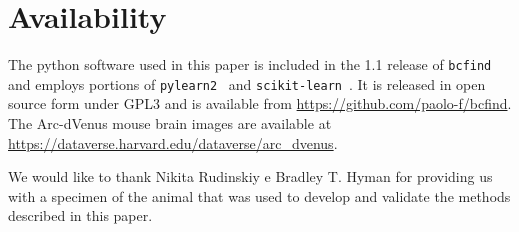 \documentclass[smallextended]{svjour3}       %
\begin{document}
\section*{Availability}
The python software used in this paper is included in the 1.1 release
of \texttt{bcfind}~\cite{frasconi_large-scale_2014} and employs
portions of \texttt{pylearn2}~\cite{goodfellow_pylearn2:_2013} and
\texttt{scikit-learn}~\cite{pedregosa_scikit-learn:_2011}. It is released in open source form
under GPL3 and is available from \url{https://github.com/paolo-f/bcfind}. 
The Arc-dVenus mouse brain images
are available at
\url{https://dataverse.harvard.edu/dataverse/arc_dvenus}.

\begin{acknowledgements}
  We would like to thank Nikita Rudinskiy e Bradley T. Hyman for
  providing us with a specimen of the animal that was used to develop
  and validate the methods described in this paper.
\end{acknowledgements}

\end{document}
